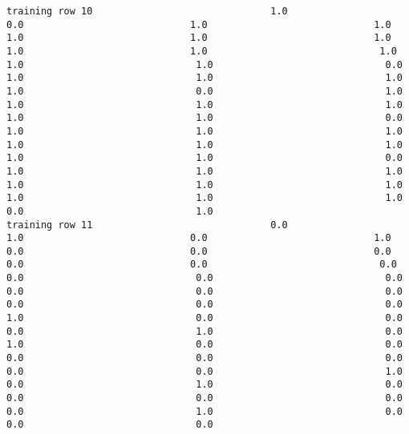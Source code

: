 \documentclass[11pt]{article}
\begin{document}
\begin{verbatim}
training row 10                               1.0                             0.0                             1.0                             1.0                             1.0                             1.0                             1.0                             1.0                             1.0                              1.0                              1.0                              1.0                              0.0                              1.0                              1.0                              1.0                              1.0                              0.0                              1.0                              1.0                              1.0                              1.0                              1.0                              1.0                              0.0                              1.0                              1.0                              1.0                              1.0                              1.0                              1.0                              1.0                              1.0                              0.0                              1.0                              1.0                              1.0                              1.0                              1.0                              1.0                              1.0                              1.0                              1.0                              0.0                              1.0
training row 11                               0.0                             1.0                             0.0                             1.0                             0.0                             0.0                             0.0                             0.0                             0.0                              0.0                              0.0                              0.0                              0.0                              0.0                              0.0                              0.0                              0.0                              0.0                              0.0                              1.0                              0.0                              0.0                              0.0                              1.0                              0.0                              1.0                              0.0                              0.0                              0.0                              0.0                              0.0                              0.0                              0.0                              1.0                              0.0                              1.0                              0.0                              0.0                              0.0                              0.0                              0.0                              1.0                              0.0                              0.0                              0.0

\end{verbatim}
\end{document}
